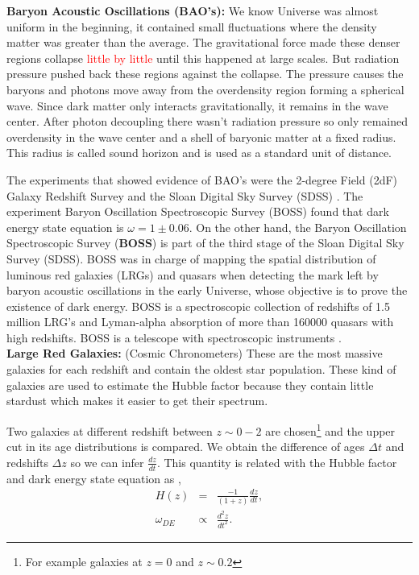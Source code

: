 \documentclass[onecolumn,           %
               showpacs,            %
               preprintnumbers,     %
               aps,                 %
               letterpaper,             %
               superscriptaddress,      %
               nofootinbib,         %
               tightenlines,        %
               floats,floatfix      %
               ,usenatbib,
               ]{revtex4-1}
\begin{document}
\textbf{Baryon Acoustic Oscillations (BAO's):} We know Universe was almost uniform in the beginning, it contained small fluctuations where the density matter was greater than the average. The gravitational force made these denser regions collapse \textcolor{red}{little by little} until this happened at large scales. But radiation pressure pushed back these regions against the collapse. The pressure causes the baryons and photons move away from the overdensity region forming a spherical wave. Since dark matter only interacts gravitationally, it remains in the wave center. After photon decoupling there wasn't radiation pressure so only remained overdensity in the wave center and a shell of baryonic matter at a fixed radius. This radius is called sound horizon and is used as a standard unit of distance. 

The experiments that showed evidence of BAO's were the 2-degree Field (2dF) Galaxy Redshift Survey \cite{BAO3} and the Sloan Digital Sky Survey (SDSS) \cite{BAO4}. The experiment Baryon Oscillation Spectroscopic Survey (BOSS) found that dark energy state equation is $\omega = 1 \pm 0.06$. On the other hand, the Baryon Oscillation Spectroscopic Survey (\textbf{BOSS}) is part of the third stage of the Sloan Digital Sky Survey (SDSS). BOSS was in charge of mapping the spatial distribution of luminous red galaxies (LRGs) and quasars when detecting the mark left by baryon acoustic oscillations in the early Universe, whose objective is to prove the existence of dark energy. BOSS is a spectroscopic collection of redshifts of 1.5 million LRG's and Lyman-alpha absorption of more than 160000 quasars with high redshifts. BOSS is a telescope with spectroscopic instruments \cite{boss}.\\

\textbf{Large Red Galaxies:} (Cosmic Chronometers) These are the most massive galaxies for each redshift and contain the oldest star population. These kind of galaxies are used to estimate the Hubble factor because they contain little stardust which makes it easier to get their spectrum. 

Two galaxies at different redshift between $z \sim 0-2$ are chosen\footnote{For example galaxies at $z=0$ and $z \sim 0.2$} and the upper cut in its age distributions is compared. We obtain the difference of ages $\Delta t$ and redshifts $\Delta z$ so we can infer $\frac{dz}{dt}$. This quantity is related with the Hubble factor and dark energy state equation as \cite{H1}, \cite{H2}
\begin{eqnarray}
H(z) &=& \frac{-1}{(1+z)} \frac{dz}{dt},\\
\omega_{DE} &\propto& \frac{d^2z}{dt^2}.
\end{eqnarray}
\end{document}
